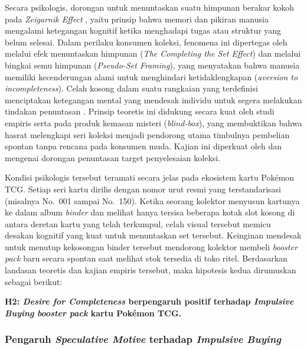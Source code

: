 \documentclass[12pt,a4paper]{article}
\numberwithin{equation}{section}
\numberwithin{table}{section}
\numberwithin{figure}{section}
\begin{document}
Secara psikologis, dorongan untuk menuntaskan suatu himpunan berakar kokoh pada \emph{Zeigarnik Effect} \citep{zeigarnik1927behalten}, yaitu prinsip bahwa memori dan pikiran manusia mengalami ketegangan kognitif ketika menghadapi tugas atau struktur yang belum selesai. Dalam perilaku konsumen koleksi, fenomena ini dipertegas oleh \citet{gao2014completing} melalui efek menuntaskan himpunan (\emph{The Completing the Set Effect}) dan \citet{barasz2017pseudo} melalui bingkai semu himpunan (\emph{Pseudo-Set Framing}), yang menyatakan bahwa manusia memiliki kecenderungan alami untuk menghindari ketidaklengkapan (\emph{aversion to incompleteness}). Celah kosong dalam suatu rangkaian yang terdefinisi menciptakan ketegangan mental yang mendesak individu untuk segera melakukan tindakan penuntasan \citep{belk1995collecting}. Prinsip teoretis ini didukung secara kuat oleh studi empiris \citet{gong2024unveiling} serta \citet{dewi2026understanding} pada produk kemasan misteri (\emph{blind-box}), yang membuktikan bahwa hasrat melengkapi seri koleksi menjadi pendorong utama timbulnya pembelian spontan tanpa rencana pada konsumen muda. Kajian ini diperkuat oleh \citet{chan2017state} dan \citet{zhang2022uncertainty} mengenai dorongan penuntasan target penyelesaian koleksi.

Kondisi psikologis tersebut teramati secara jelas pada ekosistem kartu Pok\'emon TCG. Setiap seri kartu dirilis dengan nomor urut resmi yang terstandarisasi (misalnya No.~001 sampai No.~150). Ketika seorang kolektor menyusun kartunya ke dalam album \emph{binder} dan melihat hanya tersisa beberapa kotak slot kosong di antara deretan kartu yang telah terkumpul, celah visual tersebut memicu desakan kognitif yang kuat untuk menuntaskan set tersebut. Keinginan mendesak untuk menutup kekosongan binder tersebut mendorong kolektor membeli \emph{booster pack} baru secara spontan saat melihat stok tersedia di toko ritel. Berdasarkan landasan teoretis dan kajian empiris tersebut, maka hipotesis kedua dirumuskan sebagai berikut:

\vspace{0.2cm}
\textbf{H2: \emph{Desire for Completeness} berpengaruh positif terhadap \emph{Impulsive Buying} \emph{booster pack} kartu Pok\'emon TCG.}

\subsubsection{Pengaruh \emph{Speculative Motive} terhadap \emph{Impulsive Buying}}
\end{document}
